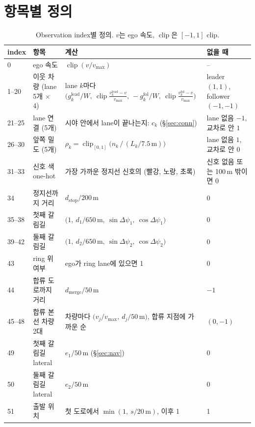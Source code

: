 \documentclass[10pt]{article}
\newcommand{\vmax}{v_{\max}}
\newcommand{\clip}{\operatorname{clip}}
\begin{document}
\section{항목별 정의}

\begin{table}[h]
\centering
\caption{Observation index별 정의. $v$는 ego 속도, $\clip$은 $[-1,1]$ clip.}
\label{tab:obs}
\small
\begin{tabularx}{\linewidth}{@{}l>{\raggedright\arraybackslash}p{3.3cm}Lp{2.6cm}@{}}
\toprule
index & 항목 & 계산 & 없을 때 \\
 & ego 속도 & $\clip(v/\vmax)$ & -- \\
1--20 & 이웃 차량 (lane 5개 $\times$ 4) & lane $k$마다 $\big(g^{\mathrm{lead}}_k/W,\ \clip\frac{v^{\mathrm{lead}}_k-v}{\vmax},\ -g^{\mathrm{fol}}_k/W,\ \clip\frac{v^{\mathrm{fol}}_k-v}{\vmax}\big)$ & leader $(1,1)$, follower $(-1,-1)$ \\
21--25 & lane 연결 (5개) & 시야 안에서 lane이 끝나는지: $c_k$ (\S\ref{sec:conn}) & lane 없음 $-1$, 교차로 안 $1$ \\
26--30 & 앞쪽 밀도 (5개) & $\rho_k = \clip_{[0,1]}\!\big(n_k \,/\, (L_k / 7.5\,\mathrm{m})\big)$ & lane 없음 $1$, 교차로 안 $0$ \\
31--33 & 신호 색 one-hot & 가장 가까운 정지선 신호의 (빨강, 노랑, 초록) & 신호 없음 또는 100\,m 밖이면 0 \\
34 & 정지선까지 거리 & $d_{\mathrm{stop}} / 200\,\mathrm{m}$ & 0 \\
35--38 & 첫째 갈림길 & $\big(1,\ d_1/650\,\mathrm{m},\ \sin\Delta\psi_1,\ \cos\Delta\psi_1\big)$ & 0 \\
39--42 & 둘째 갈림길 & $\big(1,\ d_2/650\,\mathrm{m},\ \sin\Delta\psi_2,\ \cos\Delta\psi_2\big)$ & 0 \\
43 & ring 위 여부 & ego가 ring lane에 있으면 1 & 0 \\
44 & 합류 도로까지 거리 & $d_{\mathrm{merge}} / 50\,\mathrm{m}$ & $-1$ \\
45--48 & 합류 본선 차량 2대 & 차량마다 $\big(v_j/\vmax,\ d_j/50\,\mathrm{m}\big)$, 합류 지점에 가까운 순 & $(0, -1)$ \\
49 & 첫째 갈림길 lateral & $e_1 / 50\,\mathrm{m}$ (\S\ref{sec:nav}) & 0 \\
50 & 둘째 갈림길 lateral & $e_2 / 50\,\mathrm{m}$ & 0 \\
51 & 출발 위치 & 첫 도로에서 $\min(1,\ s/20\,\mathrm{m})$, 이후 1 & 1 \\
\bottomrule
\end{tabularx}
\end{table}
\end{document}
